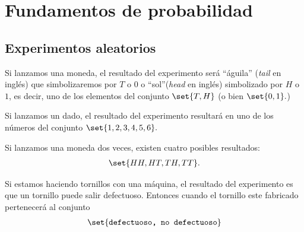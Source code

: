 


\section{Fundamentos de probabilidad}

\subsection{Experimentos aleatorios}

 \begin{ejemplo}
  \label{exmp:1.1}
  Si lanzamos una moneda, el resultado del experimento será ``águila'' (\emph{tail} en inglés) que simbolizaremos por $T$ o $0$ o ``sol''(\emph{head} en inglés) simbolizado por $H$ o $1$, es decir, uno de los elementos del conjunto $\set{T,H}$ (o bien $\set{0,1}.$)
 \end{ejemplo}



 \begin{ejemplo}
  \label{exmp:1.2}
  Si lanzamos un dado, el resultado del experimento resultará en uno de los números del conjunto $\set{1,2,3,4,5,6}.$
 \end{ejemplo}



 \begin{ejemplo}
  \label{exmp:1.3}
  Si lanzamos una moneda dos veces, existen cuatro posibles resultados:
  \begin{align*}
   \set{HH,HT,TH,TT}.
  \end{align*}

 \end{ejemplo}



 \begin{ejemplo}
  \label{exmp:1.4}
  Si estamos haciendo tornillos con una máquina, el resultado del experimento es que un tornillo puede salir defectuoso. Entonces cuando el tornillo este fabricado pertenecerá al conjunto
  \begin{align*}
   \set{\texttt{defectuoso, no defectuoso}}
  \end{align*}

 \end{ejemplo}



